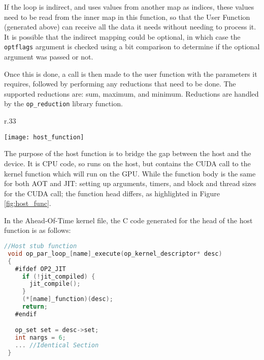  If the loop is indirect, and uses values from another map as indices, these values need to be read from the inner map in this function, so that the User Function (generated above) can receive all the data it needs without needing to process it. It is possible that the indirect mapping could be optional, in which case the \verb|optflags| argument is checked using a bit comparison to determine if the optional argument was passed or not.
\par
Once this is done, a call is then made to the user function with the parameters it requires, followed by performing any reductions that need to be done. The supported reductions are: sum, maximum, and minimum\cite[p11]{manual}. Reductions are handled by the \verb|op_reduction| library function.

\begin{wrapfigure}[8]{r}{.33\textwidth}
  \centering
  \caption{Host Function}
  \label{fig:host_func}
  \texttt{[image: host\_function]}
\end{wrapfigure}
The purpose of the host function is to bridge the gap between the host and the device. It is CPU code, so runs on the host, but contains the CUDA call to the kernel function which will run on the GPU. While the function body is the same for both AOT and JIT: setting up arguments, timers, and block and thread sizes for the CUDA call; the function head differs, as highlighted in Figure \ref{fig:host_func}.
\vspace{\parskip}

In the Ahead-Of-Time kernel file, the C code generated for the head of the host function is as follows:

\begin{lstlisting}[linewidth = \textwidth, framesep=0pt, language=C, linebackgroundcolor={\ifnum\value{lstnumber}<15 \ifnum\value{lstnumber}>10 \color{red!20} \else \color{blue!20} \fi \else \color{blue!20} \fi}]
 //Host stub function
 void op_par_loop_[name]_execute(op_kernel_descriptor* desc)
 {
   #ifdef OP2_JIT
     if (!jit_compiled) {
       jit_compile();
     }
     (*[name]_function)(desc);
     return;
   #endif

   op_set set = desc->set;
   int nargs = 6;
   ... //Identical Section
 }
\end{lstlisting}


